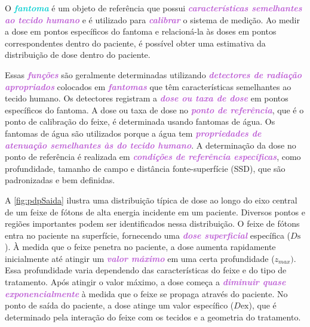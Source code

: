 \documentclass[11pt,a4paper]{article}
\begin{document}
	O \textcolor{DarkTurquoise}{\textbf{\textit{fantoma}}} é um objeto de referência que possui \textcolor{MediumOrchid}{\textbf{\textit{características semelhantes ao tecido humano}}} e é utilizado para \textcolor{MediumOrchid}{\textbf{\textit{calibrar}}} o sistema de medição. Ao medir a dose em pontos específicos do fantoma e relacioná-la às doses em pontos correspondentes dentro do paciente, é possível obter uma estimativa da distribuição de dose dentro do paciente.

	Essas \textcolor{MediumOrchid}{\textbf{\textit{funções}}} são geralmente determinadas utilizando \textcolor{MediumOrchid}{\textbf{\textit{detectores de radiação apropriados}}} colocados em \textcolor{MediumOrchid}{\textbf{\textit{fantomas}}} que têm características semelhantes ao tecido humano. Os detectores registram a \textcolor{MediumOrchid}{\textbf{\textit{dose ou taxa de dose}}} em pontos específicos do fantoma. A dose ou taxa de dose no \textcolor{MediumOrchid}{\textbf{\textit{ponto de referência}}}, que é o ponto de calibração do feixe, é determinada usando fantomas de água. Os fantomas de água são utilizados porque a água tem \textcolor{MediumOrchid}{\textbf{\textit{propriedades de atenuação semelhantes às do tecido humano}}}. A determinação da dose no ponto de referência é realizada em \textcolor{MediumOrchid}{\textbf{\textit{condições de referência específicas}}}, como profundidade, tamanho de campo e distância fonte-superfície (SSD), que são padronizadas e bem definidas.

	A \ref{fig:pdpSaida} ilustra uma distribuição típica de dose ao longo do eixo central de um feixe de fótons de alta energia incidente em um paciente. Diversos pontos e regiões importantes podem ser identificados nessa distribuição. O feixe de fótons entra no paciente na superfície, fornecendo uma \textcolor{MediumOrchid}{\textbf{\textit{dose superficial}}} específica ($D\text{s}$). À medida que o feixe penetra no paciente, a dose aumenta rapidamente inicialmente até atingir um \textcolor{MediumOrchid}{\textbf{\textit{valor máximo}}} em uma certa profundidade ($z_{max})$. Essa profundidade varia dependendo das características do feixe e do tipo de tratamento. Após atingir o valor máximo, a dose começa a \textcolor{MediumOrchid}{\textbf{\textit{diminuir quase exponencialmente}}} à medida que o feixe se propaga através do paciente. No ponto de saída do paciente, a dose atinge um valor específico ($D\text{ex}$), que é determinado pela interação do feixe com os tecidos e a geometria do tratamento.
\end{document}
